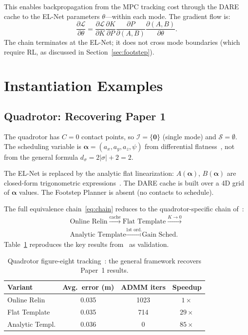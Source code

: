 \documentclass[letterpaper, 10pt, conference]{IEEEtran}
\newcommand{\balpha}{\bm{\alpha}}
\newcommand{\cS}{\mathcal{S}}
\newcommand{\cI}{\mathcal{I}}
\begin{document}
This enables backpropagation from the MPC tracking cost
through the DARE cache to the EL-Net parameters $\theta$---within
each mode.
The gradient flow is:
\[
  \frac{\partial \mathcal{L}}{\partial \theta}
  = \frac{\partial \mathcal{L}}{\partial K}
    \frac{\partial K}{\partial P}
    \frac{\partial P}{\partial (A,B)}
    \frac{\partial (A,B)}{\partial \theta}.
\]
The chain terminates at the EL-Net; it does not cross
mode boundaries (which require RL, as discussed in
Section~\ref{sec:footstep}).

\section{Instantiation Examples}\label{sec:examples}

\subsection{Quadrotor: Recovering Paper 1}

The quadrotor has $C = 0$ contact points, so
$\cI = \{\bm{0}\}$ (single mode) and $\cS = \emptyset$.
The scheduling variable is $\balpha = (a_x, a_y, a_z, \psi)$
from differential flatness~\cite{zhang2025flat},
not from the general formula $d_\sigma = 2|\sigma| + 2 = 2$.

The EL-Net is replaced by the analytic flat linearization:
$A(\balpha)$, $B(\balpha)$ are closed-form trigonometric
expressions~\cite[Eq.~(5)]{zhang2025flat}.
The DARE cache is built over a 4D grid of $\balpha$ values.
The Footstep Planner is absent (no contacts to schedule).

The full equivalence chain~\eqref{eq:chain} reduces to the
quadrotor-specific chain of~\cite{zhang2025flat}:
\begin{multline*}
  \text{Online Relin}
  \xrightarrow{\text{cache}}
  \text{Flat Template}
  \xrightarrow{K\to 0}  \\
  \text{Analytic Template}
  \xrightarrow{\text{1st ord.}}
  \text{Gain Sched.}
\end{multline*}
Table~\ref{tab:quad_results} reproduces the key results
from~\cite{zhang2025flat} as validation.

\begin{table}[t]
\centering
\caption{Quadrotor figure-eight tracking~\cite{zhang2025flat}:
  the general framework recovers Paper~1 results.}
\label{tab:quad_results}
\begin{tabular}{@{}lccc@{}}
\toprule
Variant & Avg.\ error (m) & ADMM iters & Speedup \\
\midrule
Online Relin     & 0.035 & 1023 & $1\times$ \\
Flat Template    & 0.035 & 714  & $29\times$ \\
Analytic Templ.  & 0.036 & 0    & $85\times$ \\
\bottomrule
\end{tabular}
\end{table}
\end{document}
